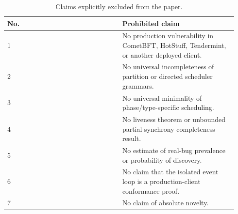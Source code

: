 \begin{table}[t]
\centering
\small
\begin{tabular}{p{0.470\linewidth}p{0.470\linewidth}}
\toprule
No. & Prohibited claim \\
\midrule
1 & No production vulnerability in CometBFT, HotStuff, Tendermint, or another deployed client. \\
2 & No universal incompleteness of partition or directed scheduler grammars. \\
3 & No universal minimality of phase/type-specific scheduling. \\
4 & No liveness theorem or unbounded partial-synchrony completeness result. \\
5 & No estimate of real-bug prevalence or probability of discovery. \\
6 & No claim that the isolated event loop is a production-client conformance proof. \\
7 & No claim of absolute novelty. \\
\bottomrule
\end{tabular}
\caption{Claims explicitly excluded from the paper.}
\label{tab:table7_nonclaims}
\end{table}
